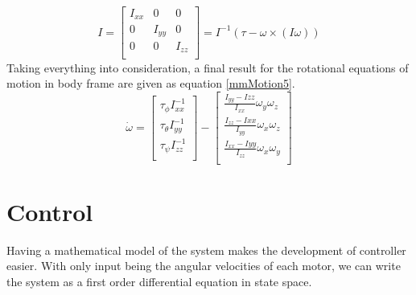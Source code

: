 \begin{equation}
\label{mmMotion4}
 	I = \begin{bmatrix}
 	I_{xx}	& 0 		& 0			\\
 	0 		& I_{yy}	& 0			\\
 	0 		& 0 		& I_{zz}	\\ 
 	\end{bmatrix} = I^{-1}(\tau - \omega \times (I\omega ))
\end{equation}
Taking everything into consideration, a final result for the rotational equations of motion in body frame are given as equation \ref{mmMotion5}.
\begin{equation}
\label{mmMotion5}
 	\dot{\omega} = \begin{bmatrix}
 	\tau _\phi I_{xx}^{-1}		\\
 	\tau _\theta I_{yy}^{-1}	\\
 	\tau _\psi I_{zz}^{-1}		\\ 
 	\end{bmatrix} - \begin{bmatrix}
 	\frac{I_{yy}-I{zz}}{I_{xx}}\omega _y\omega _z	\\
 	\frac{I_{zz}-I{xx}}{I_{yy}}\omega _x\omega _z	\\
 	\frac{I_{xx}-I{yy}}{I_{zz}}\omega _x\omega _y	\\ 
 	\end{bmatrix}
\end{equation}

\section{Control}
Having a mathematical model of the system makes the development of controller easier. With only input being the angular velocities of each motor, we can write the system as a first order differential equation in state space.

